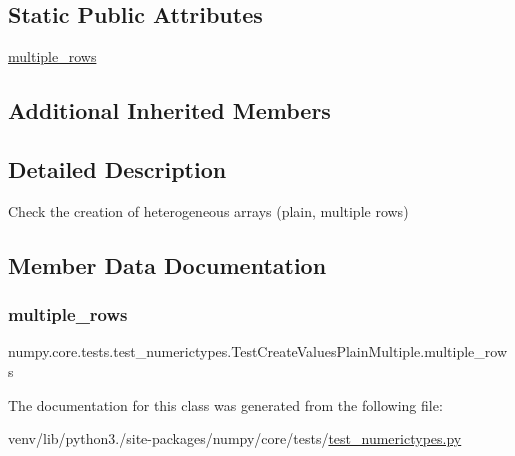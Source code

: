 \subsection*{Static Public Attributes}
\begin{DoxyCompactItemize}
\item 
\hyperlink{classnumpy_1_1core_1_1tests_1_1test__numerictypes_1_1TestCreateValuesPlainMultiple_a4e58584bf505548a0a2d56f58527cd0e}{multiple\+\_\+rows}
\end{DoxyCompactItemize}
\subsection*{Additional Inherited Members}


\subsection{Detailed Description}
\begin{DoxyVerb}Check the creation of heterogeneous arrays (plain, multiple rows)\end{DoxyVerb}
 

\subsection{Member Data Documentation}
\mbox{\label{classnumpy_1_1core_1_1tests_1_1test__numerictypes_1_1TestCreateValuesPlainMultiple_a4e58584bf505548a0a2d56f58527cd0e}} 
\subsubsection{\texorpdfstring{multiple\+\_\+rows}{multiple\_rows}}
{\footnotesize\ttfamily numpy.\+core.\+tests.\+test\+\_\+numerictypes.\+Test\+Create\+Values\+Plain\+Multiple.\+multiple\+\_\+rows\hspace{0.3cm}{\ttfamily [static]}}



The documentation for this class was generated from the following file\+:\begin{DoxyCompactItemize}
\item 
venv/lib/python3./site-\/packages/numpy/core/tests/\hyperlink{test__numerictypes_8py}{test\+\_\+numerictypes.\+py}\end{DoxyCompactItemize}
